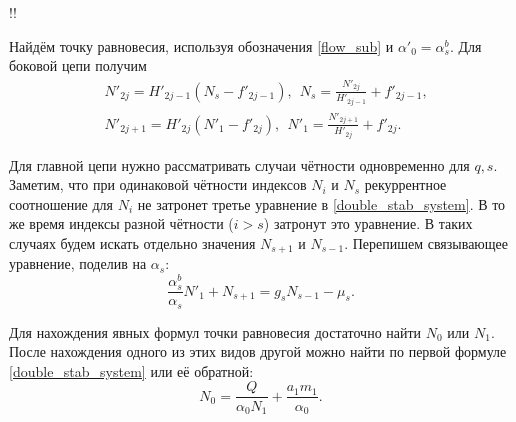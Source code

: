 !!

Найдём точку равновесия, используя обозначения \eqref{flow_sub} и \(\alpha'_0 = \alpha^b_s\). Для боковой цепи получим
\begin{equation}
    \begin{split}
        & N'_{2j} = H'_{2j-1} (N_s - f'_{2j-1}), ~~ N_s = \frac{N'_{2j}}{H'_{2j-1}} + f'_{2j-1}, \\
        & N'_{2j+1} = H'_{2j} (N'_1 - f'_{2j}), ~~ N'_1 = \frac{N'_{2j+1}}{H'_{2j}} + f'_{2j}.
    \end{split}
\end{equation}

Для главной цепи нужно рассматривать случаи чётности одновременно для \(q, s\). Заметим, что при одинаковой чётности индексов \(N_i\) и \(N_s\) рекуррентное соотношение для \(N_i\) не затронет третье уравнение в \eqref{double_stab_system}. В то же время индексы разной чётности (\(i > s\)) затронут это уравнение. В таких случаях будем искать отдельно значения \(N_{s+1}\) и \(N_{s-1}\). Перепишем связывающее уравнение, поделив на \(\alpha_s\):
\begin{equation*}
    \frac{\alpha^b_s}{\alpha_s} N'_1 + N_{s+1} = g_s N_{s-1} - \mu_{s}.
\end{equation*}

Для нахождения явных формул точки равновесия достаточно найти \(N_0\) или \(N_1\). После нахождения одного из этих видов другой можно найти по первой формуле \eqref{double_stab_system} или её обратной:
\begin{equation} \label{split_N0_from_N1}
    N_0 = \frac{Q}{\alpha_0 N_1} + \frac{a_1 m_1}{\alpha_0}.
\end{equation}

